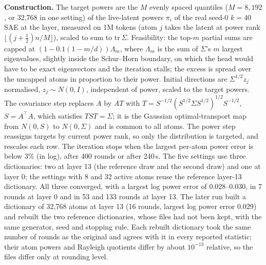 \documentclass[10pt,twocolumn]{article}
\newcommand{\Sig}{\Sigma}
\begin{document}
\textbf{Construction.} The target powers are the $M$ evenly spaced quantiles ($M=8{,}192$, or 32,768 in one setting) of the live-latent powers $\pi_i$ of the real seed-0 $k=40$ SAE at the layer, measured on 1M tokens (atom $j$ takes the latent at power rank $\lfloor (j+\frac12)n/M\rfloor$), scaled to sum to $\mathrm{tr}\,\Sig$. Feasibility: the top-$m$ partial sums are capped at $(1-0.1(1-m/d))\Lambda_m$, where $\Lambda_m$ is the sum of $\Sig$'s $m$ largest eigenvalues, slightly inside the Schur--Horn boundary, on which the head would have to be exact eigenvectors and the iteration stalls; the excess is spread over the uncapped atoms in proportion to their power. Initial directions are $\Sig^{1/2}z_j$ normalised, $z_j \sim N(0,I)$, independent of power, scaled to the target powers. The covariance step replaces $A$ by $AT$ with $T = S^{-1/2}(S^{1/2}\Sig S^{1/2})^{1/2}S^{-1/2}$, $S=A^\top A$, which satisfies $TST=\Sig$; it is the Gaussian optimal-transport map from $N(0,S)$ to $N(0,\Sig)$ and is common to all atoms. The power step reassigns targets by current power rank, so only the distribution is targeted, and rescales each row. The iteration stops when the largest per-atom power error is below 3\% (in log), after 400 rounds or after 240\,s. The five settings use three dictionaries: two at layer 13 (the reference draw and the second draw) and one at layer 0; the settings with 8 and 32 active atoms reuse the reference layer-13 dictionary. All three converged, with a largest log power error of 0.028--0.030, in 7 rounds at layer 0 and in 53 and 133 rounds at layer 13. The later run built a dictionary of 32,768 atoms at layer 13 (16 rounds, largest log power error 0.029) and rebuilt the two reference dictionaries, whose files had not been kept, with the same generator, seed and stopping rule. Each rebuilt dictionary took the same number of rounds as the original and agrees with it in every reported statistic; their atom powers and Rayleigh quotients differ by about $10^{-13}$ relative, so the files differ only at rounding level.
\end{document}
